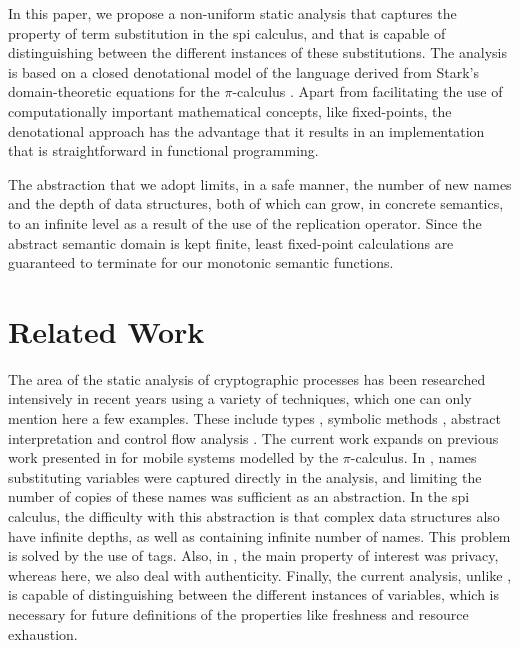 \documentclass{entcs} \usepackage{entcsmacro}
\begin{document}
In this paper, we propose a non-uniform static analysis that captures the property of term substitution in the spi calculus, and that is capable of distinguishing between the different instances of these substitutions.  The analysis is based on a closed denotational model of the language derived from Stark's domain-theoretic equations for the $\pi$-calculus \cite{stark1}. Apart from facilitating the use of computationally important mathematical concepts, like fixed-points, the denotational approach has the advantage that it results in an implementation that is straightforward in functional programming.

The abstraction that we adopt limits, in a safe manner, the number of new names and the depth of data structures, both of which can grow, in concrete semantics, to an infinite level as a result of the use of the replication operator.  Since the abstract semantic domain is kept finite, least fixed-point calculations are guaranteed to terminate for our monotonic semantic functions.
\section{Related Work}
The area of the static analysis of cryptographic processes has been researched intensively in recent years using a variety of techniques, which one can only mention here a few examples.  These include types \cite{abadi2,abadi3,blanchet1}, symbolic methods \cite{amadio1,huima1,boreale1,boreale2,martinelli1}, abstract interpretation \cite{monn1,aziz2,feret1,venet1} and control flow analysis \cite{bodei1,bodei2,bodei3,bodei4}. The current work expands on previous work presented in \cite{aziz2} for mobile systems modelled by the $\pi$-calculus.  In \cite{aziz2}, names substituting variables were captured directly in the analysis, and limiting the number of copies of these names was sufficient as an abstraction.  In the spi calculus, the difficulty with this abstraction is that complex data structures also have infinite depths, as well as containing infinite number of names.  This problem is solved by the use of tags.  Also, in \cite{aziz2}, the main property of interest was privacy, whereas here, we also deal with authenticity.  Finally, the current analysis, unlike \cite{aziz2}, is capable of distinguishing between the different instances of variables, which is necessary for future definitions of the properties like freshness and resource exhaustion.
\end{document}
